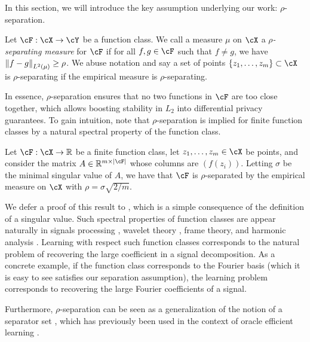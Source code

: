     In this section, we will introduce the key assumption underlying our work: $\rho$-separation.

    \begin{definition}\label{def:rho_separating}
        Let $\cF: \cX \to \cY$ be a function class.  We call a measure $\mu$ on $\cX$ a $\rho$\emph{-separating measure} for $\cF$ if for all $f, g \in \cF$ such that $f \neq g$, we have $\left\|f-g\right\|_{L^2(\mu)} \geq \rho$.  We abuse notation and say a set of points $\left\{ z_1, \dots, z_m \right\} \subset \cX$ is $\rho$-separating if the empirical measure is $\rho$-separating.
    \end{definition}
    In essence, $\rho$-separation ensures that no two functions in $\cF$ are too close together, which allows boosting stability in $L_2$ into differential privacy guarantees.  To gain intuition, note that $\rho$-separation is implied for finite function classes by a natural spectral property of the function class.
    \begin{proposition}\label{prop:singular_value}
        Let $\cF: \cX \to \rr$ be a finite function class, let $z_1, \dots, z_m \in \cX$ be points, and consider the matrix $A \in \rr^{m \times \abs{\cF}}$ whose columns are $(f(z_i))$.  Letting $\sigma$ be the minimal singular value of $A$, we have that $\cF$ is $\rho$-separated by the empirical measure on $\cX$ with $\rho = \sigma \sqrt{2/m}$.
    \end{proposition}
    We defer a proof of this result to , which is a simple consequence of the definition of a singular value. 
    Such spectral properties of function classes are appear naturally in signals processing \citep{vetterli2014foundations}, wavelet theory \citep{stephane1999wavelet}, frame theory, and harmonic analysis \citep{benedetto2020harmonic}. 
    Learning with respect such function classes corresponds to the natural problem of recovering the large coefficient in a signal decomposition. 
    As a concrete example, if the function class corresponds to the Fourier basis (which it is easy to see satisfies our separation assumption), the learning problem corresponds to recovering the large Fourier coefficients of a signal. 
    


    Furthermore, $\rho$-separation can be seen as a generalization of the notion of a separator set \cite{goldman1993exact}, which has previously been used in the context of oracle efficient learning \citep{dudik2020oracle,DBLP:conf/focs/Neel0W19,block2024oracle}. 

